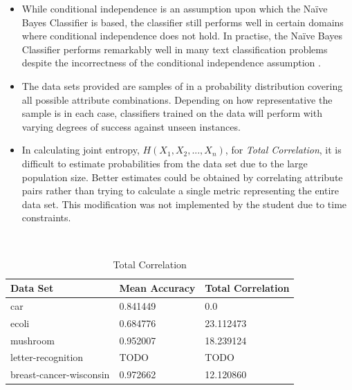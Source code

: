 \documentclass[10pt]{report}
\begin{document}
\begin{itemize}
  \item While conditional independence is an assumption upon which the
    Na\"{i}ve Bayes Classifier is based, the classifier still performs
    well in certain domains where conditional independence does not
    hold. In practise, the Na\"{i}ve Bayes Classifier performs
    remarkably well in many text classification problems despite the
    incorrectness of the conditional independence assumption
    \cite{Mitchell1997}. 

  \item The data sets provided are samples of in a probability
    distribution covering all possible attribute
    combinations. Depending on how representative the sample is in
    each case, classifiers trained on the data will perform with
    varying degrees of success against unseen instances.

  \item In calculating joint entropy, \(H(X_1,X_2,...,X_n)\), for
    \textit{Total Correlation}, it is difficult to estimate
    probabilities from the data set due to the large population
    size. Better estimates could be obtained by correlating attribute
    pairs rather than trying to calculate a single metric
    representing the entire data set. This modification was not
    implemented by the student due to time constraints. 
\end{itemize}

\\
\begin{table}[h]
  \centering
  \begin{tabular}{ |l|l|l|} 
    \hline
    \textbf{Data Set} & \textbf{Mean Accuracy} & \textbf{Total Correlation} \\ \hline
    car                      &  0.841449  &  0.0       \\ \hline
    ecoli                    &  0.684776  &  23.112473 \\ \hline
    mushroom                 &  0.952007  &  18.239124 \\ \hline
    letter-recognition       &  TODO      &  TODO      \\ \hline
    breast-cancer-wisconsin  &  0.972662  &  12.120860 \\ \hline
  \end{tabular}
  \caption{Total Correlation}
  \label{tab:correlation}
\end{table}
\end{document}
